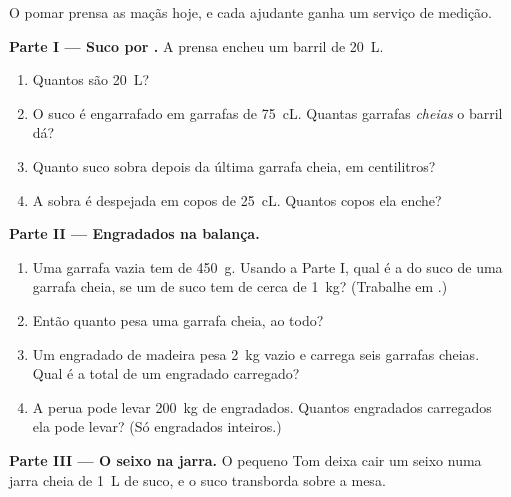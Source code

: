 \begin{problem}\label{pb:g6:mass-and-volume:1}
O pomar prensa as maçãs hoje, e cada ajudante ganha um serviço de
medição.

\medskip\noindent\textbf{Parte I --- Suco por .}
A prensa encheu um barril de \qty{20}{L}.
\begin{enumerate}
  \item Quantos  são \qty{20}{L}?
  \item O suco é engarrafado em garrafas de \qty{75}{cL}. Quantas
        garrafas \emph{cheias} o barril dá?
  \item Quanto suco sobra depois da última garrafa cheia, em
        centilitros?
  \item A sobra é despejada em copos de \qty{25}{cL}. Quantos copos
        ela enche?
\end{enumerate}

\medskip\noindent\textbf{Parte II --- Engradados na balança.}
\begin{enumerate}[resume]
  \item Uma garrafa vazia tem  de \qty{450}{g}. Usando a Parte
        I, qual é a  do suco de uma garrafa cheia, se um 
        de suco tem  de cerca de \qty{1}{kg}? (Trabalhe em
        .)
  \item Então quanto pesa uma garrafa cheia, ao todo?
  \item Um engradado de madeira pesa \qty{2}{kg} vazio e carrega seis
        garrafas cheias. Qual é a  total de um engradado
        carregado?
  \item A perua pode levar \qty{200}{kg} de engradados. Quantos
        engradados carregados ela pode levar? (Só engradados
        inteiros.)
\end{enumerate}

\medskip\noindent\textbf{Parte III --- O seixo na jarra.}
O pequeno Tom deixa cair um seixo numa jarra cheia de \qty{1}{L} de
suco, e o suco transborda sobre a mesa.


\end{problem}
